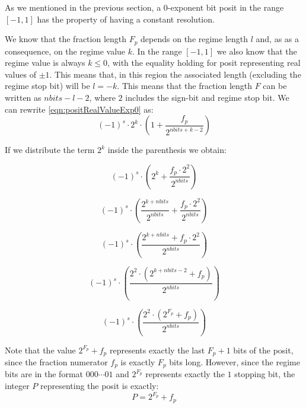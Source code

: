 As we mentioned in the previous section, a 0-exponent bit posit in the range $[-1,1]$ has the property of having a constant resolution. 

We know that the fraction length $F_p$ depends on the regime length $l$ and, as as a consequence, on the regime value $k$. In the range $[-1,1]$ we also know that the regime value is always $k \leq 0$, with the equality holding for posit representing real values of $\pm 1$. This means that, in this region the associated length (excluding the regime stop bit) will be $l = - k$. This means that the fraction length $F$ can be written as $nbits - l - 2$, where $2$ includes the sign-bit and regime stop bit. We can rewrite \eqref{eqn:positRealValueExp0} as:
\begin{equation}
    (-1)^s \cdot 2^k \cdot \left ( 1 + \frac{f_p}{2^{nbits + k - 2}} \right )
\end{equation}

If we distribute the term $2^k$ inside the parenthesis we obtain:

\begin{equation}
    (-1)^s \cdot \left ( 2^k + \frac{f_p\cdot 2^2}{2^{nbits}} \right )
\end{equation}

\begin{equation}
    (-1)^s \cdot \left ( \frac{2^{k+nbits}}{2^{nbits}} + \frac{f_p\cdot 2^2}{2^{nbits}} \right )
\end{equation}

\begin{equation}
    (-1)^s \cdot \left ( \frac{2^{k+nbits} + f_p\cdot 2^2}{2^{nbits}} \right )
\end{equation}

\begin{equation}
    (-1)^s \cdot \left ( \frac{2^2 \cdot (2^{k+ nbits - 2} + f_p)}{2^{nbits}} \right )
\end{equation}

\begin{equation}\label{eqn:posit0exponentInUnitaryRange}
    (-1)^s \cdot \left ( \frac{2^2 \cdot (2^{F_p} + f_p)}{2^{nbits}} \right )
\end{equation}

Note that the value $2^{F_p} + f_p$ represents exactly the last $F_p + 1$ bits of the posit, since the fraction numerator $f_p$ is exactly $F_p$ bits long. However, since the regime bits are in the format $000 \cdots 01$ and $2^{F_p}$ represents exactly the $1$ stopping bit, the integer $P$ representing the posit is exactly:
\begin{equation}\label{eqn:posit0expUnitary}
    P = 2^{F_p} + f_p
\end{equation}

